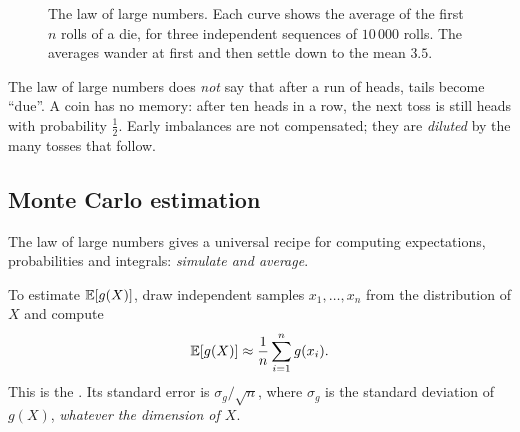 \begin{figure}[htbp]
\caption{The law of large numbers. Each curve shows the average of the first $n$
  rolls of a die, for three independent sequences of $10\,000$ rolls. The
  averages wander at first and then settle down to the mean $3.5$.}
\label{fig:lln}
\end{figure}

\begin{pitfall}
The law of large numbers does \emph{not} say that after a run of heads, tails
become ``due''. A coin has no memory: after ten heads in a row, the next toss is
still heads with probability $\frac12$. Early imbalances are not compensated;
they are \emph{diluted} by the many tosses that follow.
\end{pitfall}

\subsection{Monte Carlo estimation}

The law of large numbers gives a universal recipe for computing expectations,
probabilities and integrals: \emph{simulate and average}.

\begin{definition}\label{def:monte-carlo}
To estimate $\mathbb{E}[g(X)]$, draw independent samples $x_1, \dots, x_n$ from the
distribution of $X$ and compute
\[
  \mathbb{E}[g(X)] \approx \frac1n\sum_{i=1}^n g(x_i) .
\]
This is the . Its standard error is
$\sigma_g/\sqrt n$, where $\sigma_g$ is the standard deviation of $g(X)$,
\emph{whatever the dimension of $X$}.
\end{definition}

